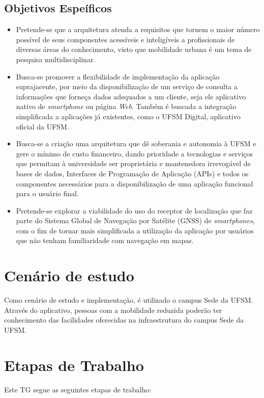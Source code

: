 \documentclass[oneside,openright,12pt]{ufsm_2015} %
\begin{document}
\subsection{Objetivos Espeíficos}
\begin{itemize}
    \item Pretende-se que a arquitetura atenda a requisitos que tornem o maior número possível de seus componentes acessíveis e inteligíveis a profissionais de diversas áreas do conhecimento, visto que mobilidade urbana é um tema de pesquisa multidisciplinar.
    \item  Busca-se promover a flexibilidade de implementação da aplicação suprajacente, por meio da disponibilização de um serviço de consulta a informações que forneça dados adequados a um cliente, seja ele aplicativo nativo de \textit{smartphone} ou página \textit{Web}. Também é buscada a integração simplificada a aplicações já existentes, como o UFSM Digital, aplicativo oficial da UFSM.
    \item Busca-se a criação uma arquitetura que dê soberania e autonomia à UFSM e gere o mínimo de custo financeiro, dando prioridade a tecnologias e serviços que permitam à universidade ser proprietária e mantenedora irrevogável de bases de dados,  Interfaces de Programação de Aplicação (APIs) e todos os componentes necessários para a disponibilização de uma aplicação funcional para o usuário final.
    \item Pretende-se explorar a viabilidade do uso do receptor de localização que faz parte do Sistema Global de Navegação por Satélite (GNSS) de \textit{smartphones}, com o fim de tornar mais simplificada a utilização da aplicação por usuários que não tenham familiaridade com navegação em mapas.
\end{itemize}

\section{Cenário de estudo}
Como cenário de estudo e implementação, é utilizado o campus Sede da UFSM.
Através do aplicativo, pessoas com a mobilidade reduzida poderão ter conhecimento das facilidades oferecidas na infraestrutura do campus Sede da UFSM. 

\section{Etapas de Trabalho}

Este TG segue as seguintes etapas de trabalho: 
\end{document}
